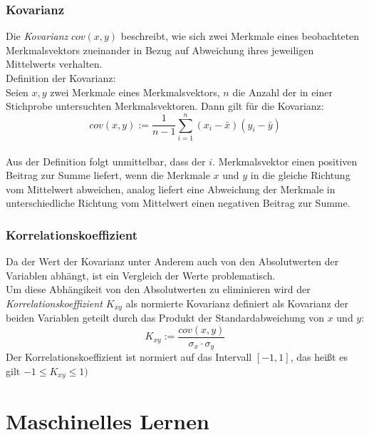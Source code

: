 \documentclass[fontsize=11pt]{scrartcl}
\begin{document}
                    \subsubsection{Kovarianz}
                        Die \emph{Kovarianz} $cov(x,y)$ beschreibt, wie sich zwei Merkmale eines beobachteten Merkmalsvektors zueinander in Bezug auf Abweichung ihres jeweiligen Mittelwerts verhalten. \cite{ertel2016}\\
                        Definition der Kovarianz:\\
                        Seien $x,y$ zwei Merkmale eines Merkmalsvektors, $n$ die Anzahl der in einer Stichprobe untersuchten Merkmalsvektoren. Dann gilt für die Kovarianz:
                        $$
                            cov(x,y) := \frac{1}{n-1}\sum_{i=1}^n(x_i - \bar{x})(y_i - \bar{y})
                        $$ \cite{kohn2005}\\
                        Aus der Definition folgt unmittelbar, dass der $i$. Merkmalsvektor einen positiven Beitrag zur Summe liefert, wenn die Merkmale $x$ und $y$ in die gleiche Richtung vom Mittelwert abweichen, analog liefert eine Abweichung der Merkmale in unterschiedliche Richtung vom Mittelwert einen negativen Beitrag zur Summe. \cite{ertel2016}

                    \subsubsection{Korrelationskoeffizient}
                        Da der Wert der Kovarianz unter Anderem auch von den Absolutwerten der Variablen abhängt, ist ein Vergleich der Werte problematisch.
                        \cite{ertel2016} \\
                        Um diese Abhängikeit von den Absolutwerten zu eliminieren wird der \emph{Korrelationskoeffizient $K_{xy}$} als normierte Kovarianz definiert als Kovarianz der beiden Variablen geteilt durch das Produkt der Standardabweichung von $x$ und $y$:
                        $$
                            K_{xy} := \frac{cov(x,y)}{\sigma_x \cdot \sigma_y} 
                        $$
                        Der Korrelationskoeffizient ist normiert auf das Intervall $[-1,1]$, das heißt es gilt $-1 \leq K_{xy} \leq 1)$
                        \cite{kohn2005}

        \section{Maschinelles Lernen}
            
\end{document}
